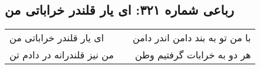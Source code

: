 \begin{center}
\section*{رباعی شماره ۳۲۱: ای یار قلندر خراباتی من}
\label{sec:sh321}
\begin{longtable}{l p{0.5cm} r}
ای یار قلندر خراباتی من
&&
با من تو به بند دامن اندر دامن
\\
من نیز قلندرانه در دادم تن
&&
هر دو به خرابات گرفتیم وطن
\\
\end{longtable}
\end{center}
